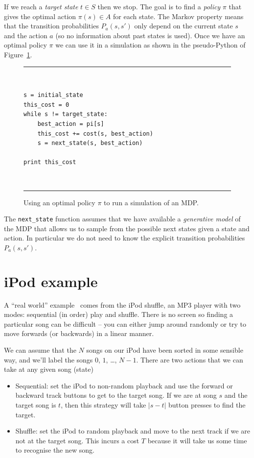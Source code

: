 \documentclass[12pt,amstags,fleqn]{article}
\theoremstyle{plain}
\theoremstyle{definition}
\theoremstyle{definition}
\begin{document}
If we reach a {\em target state} $t \in S$ then we stop.  
The goal is to find a {\em policy} $\pi$ that gives the optimal action
$\pi(s) \in A$ for each state.
The Markov property means that the transition probabilities
$P_a(s,s')$ only depend on the current state $s$ and the action $a$
(so no information about past states is used).
Once we have an optimal policy $\pi$ we can use it in a simulation as
shown in the pseudo-Python of Figure~\ref{mdpsim}.
\begin{figure}[htb]
\hrule
~
\begin{verbatim}
s = initial_state
this_cost = 0
while s != target_state:
    best_action = pi[s]
    this_cost += cost(s, best_action)
    s = next_state(s, best_action)

print this_cost
\end{verbatim}
~
\hrule
\caption{Using an optimal policy $\pi$ to run a simulation of an MDP.}\label{mdpsim}
\end{figure}
The \texttt{next\_state} function assumes that we have available a 
{\em generative model} of the MDP that allows us to sample from the
possible next states given a state and action. In particular we do not
need to know the explicit transition probabilities $P_a(s,s')$.


\section{iPod example}

A ``real world'' example~\cite{ipodnorvig} comes from the iPod
shuffle, an MP3 player with two modes: sequential (in order) play
and shuffle. There is no screen so finding a particular song can
be difficult -- you can either jump around randomly or try to move
forwards (or backwards) in a linear manner.

We can assume that the $N$ songs on our iPod have been sorted in some
sensible way, and we'll label the songs $0$, $1$, \dots, $N-1$.
There are two actions that we can take at any given song (state)

\begin{itemize}

\item Sequential: set the iPod to non-random playback and use the
forward or backward track buttons to get to the target song. If we
are at song $s$ and the target song is $t$, then this strategy will take
$\left| s - t \right|$ button presses to find the target.

\item Shuffle: set the iPod to random playback and move to the next
track if we are not at the target song. This incurs a cost $T$ because
it will take us some time to recognise the new song.

\end{itemize}
\end{document}
